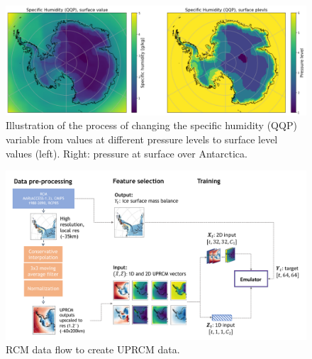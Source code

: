 \documentclass[a4paper,11pt,oneside]{report}
\begin{document}
\begin{figure}[!htb]
  \centering
  \includegraphics[width=\columnwidth]{doc/Thesis-latex/images/example-plevels.pdf}
  \caption []{\small Illustration of the process of changing the specific humidity (QQP) variable from values at different pressure levels to surface level values (left). Right: pressure at surface over Antarctica.}
  \vspace{-3mm}
  \label{fig:example-plevels}
\end{figure}

\begin{figure}[!htb]
  \centering
  \includegraphics[width=\columnwidth]{images/data-flow.pdf}
  \caption []{\small RCM data flow to create UPRCM data.}
  \vspace{-3mm}
  \label{fig:training-data-flow}
\end{figure}
\end{document}
